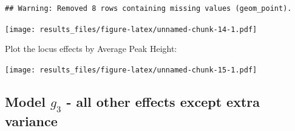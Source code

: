\documentclass[]{article}
\newenvironment{Shaded}{\begin{snugshade}}{\end{snugshade}}
\newcommand{\DataTypeTok}[1]{\textcolor[rgb]{0.13,0.29,0.53}{#1}}
\newcommand{\KeywordTok}[1]{\textcolor[rgb]{0.13,0.29,0.53}{\textbf{#1}}}
\newcommand{\NormalTok}[1]{#1}
\newcommand{\OperatorTok}[1]{\textcolor[rgb]{0.81,0.36,0.00}{\textbf{#1}}}
\newcommand{\OtherTok}[1]{\textcolor[rgb]{0.56,0.35,0.01}{#1}}
\newcommand{\StringTok}[1]{\textcolor[rgb]{0.31,0.60,0.02}{#1}}
\begin{document}
\begin{verbatim}
## Warning: Removed 8 rows containing missing values (geom_point).
\end{verbatim}

\texttt{[image: results\_files/figure-latex/unnamed-chunk-14-1.pdf]}

Plot the locus effects by Average Peak Height:

\begin{Shaded}
\end{Shaded}

\texttt{[image: results\_files/figure-latex/unnamed-chunk-15-1.pdf]}

\hypertarget{model-g_3---all-other-effects-except-extra-variance}{%
\subsection{\texorpdfstring{Model \(g_3\) - all other effects except
extra
variance}{Model g\_3 - all other effects except extra variance}}\label{model-g_3---all-other-effects-except-extra-variance}}
\end{document}
